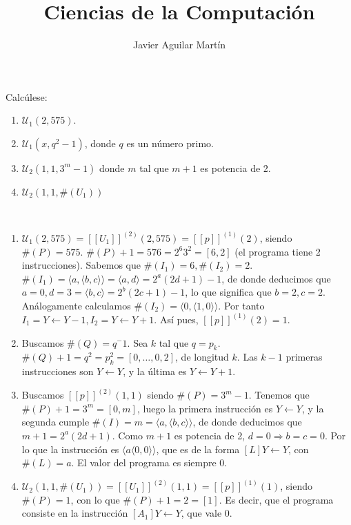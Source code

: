 \documentclass[twoside]{article}
\begin{document}
\title{Ciencias de la Computación}

\author{Javier Aguilar Martín}
\maketitle

\begin{ejercicio}{5}
Calcúlese:
\begin{enumerate}
\item $\mathcal{U}_1(2,575)$.
\item $\mathcal{U}_1(x,q^2-1)$, donde $q$ es un número primo.
\item $\mathcal{U}_2(1,1,3^m-1)$ donde $m$ tal que $m+1$ es potencia de 2.
\item $\mathcal{U}_2(1,1,\#(U_1))$ 
\end{enumerate}
\end{ejercicio}
\begin{solucion}\
\begin{enumerate}
\item  $\mathcal{U}_1(2,575)=[[U_1]]^{(2)}(2,575)=[[p]]^{(1)}(2)$, siendo $\#(P)=575$. $\#(P)+1=576=2^6 3^2=[6,2]$ (el programa tiene 2 instrucciones). Sabemos que $\#(I_1)=6,\#(I_2)=2$.$\#(I_1)=\langle a,\langle b,c\rangle\rangle=\langle a,d\rangle=2^a(2d+1)-1$, de donde deducimos que $a=0,d=3=\langle b,c\rangle=2^b(2c+1)-1$, lo que significa que $b=2,c=2$. Análogamente calculamos $\#(I_2)=\langle 0, \langle 1,0\rangle\rangle$. Por tanto $I_1=Y\leftarrow Y-1, I_2=Y\leftarrow Y+1$. Así pues, $[[p]]^{(1)}(2)=1$. 
\item  Buscamos $\#(Q)=q^-1$. Sea $k$ tal que $q=p_k$. $\#(Q)+1=q^2=p_k^2=[0,\dots,0,2]$, de longitud $k$. Las $k-1$ primeras instrucciones son $Y\leftarrow Y$, y la última es $Y\leftarrow Y+1$. 
\item  Buscamos $[[p]]^{(2)}(1,1)$ siendo $\#(P)=3^m-1$. Tenemos que $\#(P)+1=3^m=[0,m]$, luego la primera instrucción es $Y\leftarrow Y$, y la segunda cumple $\#(I)=m=\langle a,\langle b,c\rangle\rangle$, de donde deducimos que $m+1=2^a(2d+1)$. Como $m+1$ es potencia de 2, $d=0\Rightarrow b=c=0$. Por lo que la instrucción es $\langle a\langle 0,0\rangle\rangle$, que es de la forma $[L] Y\leftarrow Y$, con $\#(L)=a$. El valor del programa es siempre 0.
\item $\mathcal{U}_2(1,1,\#(U_1))=[[U_1]]^{(2)}(1,1)=[[p]]^{(1)}(1)$, siendo $\#(P)=1$, con lo que $\#(P)+1=2=[1]$. Es decir, que el programa consiste en la instrucción $[A_1] Y\leftarrow Y$, que vale 0.
\end{enumerate}
\end{solucion}
\end{document}
